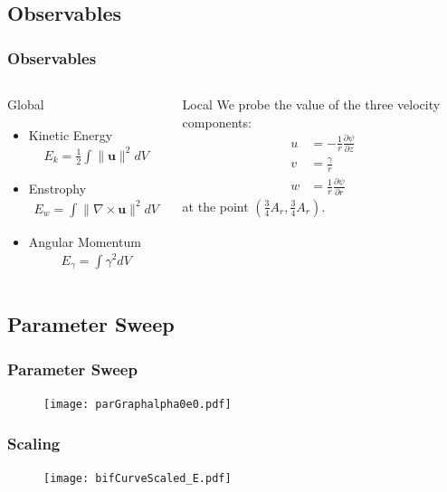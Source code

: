 \documentclass[compress]{beamer}
\begin{document}
\subsection{Observables}
\begin{frame}\frametitle{Observables}
\begin{columns}
\begin{block}{Global}
\begin{itemize}
\item Kinetic Energy
\begin{align*}
E_k = \frac{1}{2}\int \|\textbf{u}\|^2dV
\end{align*}
\item Enstrophy
\begin{align*}
E_w = \int \|\nabla\times\textbf{u}\|^2dV
\end{align*}
\item Angular Momentum
\begin{align*}
E_{\gamma} = \int \gamma^2dV
\end{align*}
\end{itemize}
\end{block}
\begin{block}{Local}
We probe the value of the three velocity components:
\begin{align*}
u &= -\frac{1}{r}\frac{\partial\psi}{\partial z}\\
v &= \frac{\gamma}{r}\\
w &= \frac{1}{r}\frac{\partial\psi}{\partial r}
\end{align*}
 at the point $\left(\frac{3}{4}A_r,\frac{3}{4}A_r\right)$.
\end{block}
\end{columns}
\end{frame}

\subsection{Parameter Sweep}

\begin{frame}\frametitle{Parameter Sweep}
\begin{figure}
\centering
\texttt{[image: parGraphalpha0e0.pdf]}
\end{figure}
\end{frame}

\begin{frame}\frametitle{Scaling}
\begin{figure}
\centering
\texttt{[image: bifCurveScaled\_E.pdf]}
\end{figure}
\end{frame}
\end{document}
